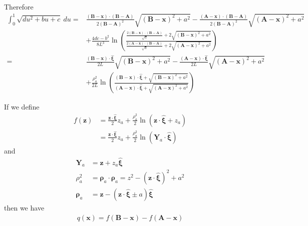 Therefore
\begin{align}
\int_0^1\sqrt{du^2+bu+c}\ du
=&\frac{(\bm B-\bm x)\cdot(\bm B-\bm A)}{2(\bm B-\bm A)^2}\sqrt{(\bm B-\bm x)^2+a^2}-\frac{(\bm A-\bm x)\cdot(\bm B-\bm A)}{2(\bm B-\bm A)^2}\sqrt{(\bm A-\bm x)^2+a^2}\nonumber\\
&+\frac{4dc-b^2}{8L^3}\ln\left(\frac{\frac{2(\bm B-\bm x)\cdot(\bm B-\bm A)}{\sqrt{d}}+2\sqrt{(\bm B-\bm x)^2+a^2}}{\frac{2(\bm A-\bm x)\cdot(\bm B-\bm A)}{\sqrt{d}}+2\sqrt{(\bm A-\bm x)^2+a^2}}\right)\nonumber\\
=&\frac{(\bm B-\bm x)\cdot\hat{\bm\xi}}{2L}\sqrt{(\bm B-\bm x)^2+a^2}-\frac{(\bm A-\bm x)\cdot\hat{\bm\xi}}{2L}\sqrt{(\bm A-\bm x)^2+a^2}\nonumber\\
&+\frac{\rho^2_a}{2L}\ln\left(\frac{(\bm B-\bm x)\cdot\hat{\bm\xi}+\sqrt{(\bm B-\bm x)^2+a^2}}{(\bm A-\bm x)\cdot\hat{\bm\xi}+\sqrt{(\bm A-\bm x)^2+a^2}}\right)
\end{align}

If we define
\begin{align}
f(\bm z)
&=\frac{\bm z\cdot\hat{\bm\xi}}{2}z_a + \frac{\rho^2_a}{2}\ln\left(\bm z\cdot\hat{\bm\xi}+z_a\right)\nonumber\\
&=\frac{\bm z\cdot\hat{\bm\xi}}{2}z_a + \frac{\rho^2_a}{2}\ln\left(\bm Y_a\cdot\hat{\bm \xi}\right)
\end{align}
and
\begin{align}
\bm Y_a&=\bm z+z_a\hat{\bm\xi}\\
\rho_a^2&=\bm \rho_a\cdot\bm \rho_a=z^2-(\bm z\cdot\hat{\bm \xi})^2+a^2\\
\bm \rho_a&=\bm z-(\bm z\cdot\hat{\bm\xi}\pm a)\hat{\bm\xi}
\end{align}
then  we have
\begin{align}
q(\bm x)=f(\bm B-\bm x)-f(\bm A-\bm x)
\end{align}

